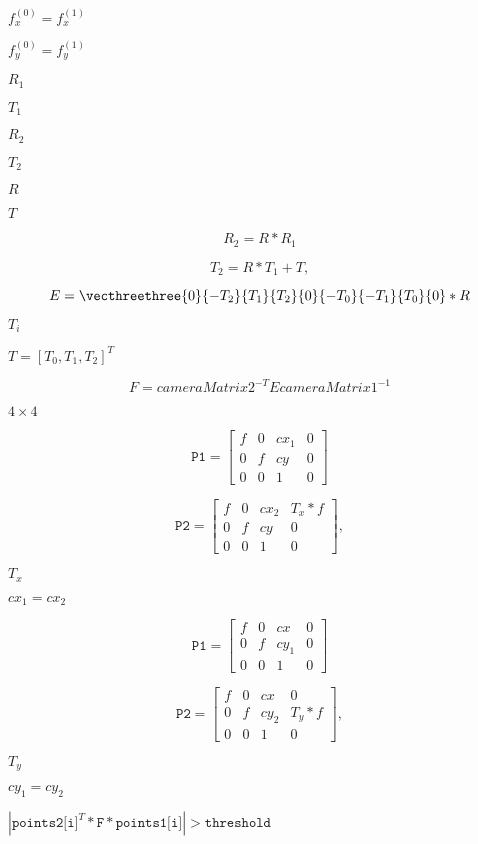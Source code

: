 \documentclass{article}
\begin{document}
$f^{(0)}_x=f^{(1)}_x$
\pagebreak

$f^{(0)}_y=f^{(1)}_y$
\pagebreak

$R_1$
\pagebreak

$T_1$
\pagebreak

$R_2$
\pagebreak

$T_2$
\pagebreak

$R$
\pagebreak

$T$
\pagebreak

\[R_2=R*R_1\]
\pagebreak

\[T_2=R*T_1 + T,\]
\pagebreak

\[E= \vecthreethree{0}{-T_2}{T_1}{T_2}{0}{-T_0}{-T_1}{T_0}{0} *R\]
\pagebreak

$T_i$
\pagebreak

$T=[T_0, T_1, T_2]^T$
\pagebreak

\[F = cameraMatrix2^{-T} E cameraMatrix1^{-1}\]
\pagebreak

$4 \times 4$
\pagebreak

\[\texttt{P1} = \begin{bmatrix} f & 0 & cx_1 & 0 \\ 0 & f & cy & 0 \\ 0 & 0 & 1 & 0 \end{bmatrix}\]
\pagebreak

\[\texttt{P2} = \begin{bmatrix} f & 0 & cx_2 & T_x*f \\ 0 & f & cy & 0 \\ 0 & 0 & 1 & 0 \end{bmatrix} ,\]
\pagebreak

$T_x$
\pagebreak

$cx_1=cx_2$
\pagebreak

\[\texttt{P1} = \begin{bmatrix} f & 0 & cx & 0 \\ 0 & f & cy_1 & 0 \\ 0 & 0 & 1 & 0 \end{bmatrix}\]
\pagebreak

\[\texttt{P2} = \begin{bmatrix} f & 0 & cx & 0 \\ 0 & f & cy_2 & T_y*f \\ 0 & 0 & 1 & 0 \end{bmatrix} ,\]
\pagebreak

$T_y$
\pagebreak

$cy_1=cy_2$
\pagebreak

$|\texttt{points2[i]}^T*\texttt{F}*\texttt{points1[i]}|>\texttt{threshold}$
\pagebreak
\end{document}
